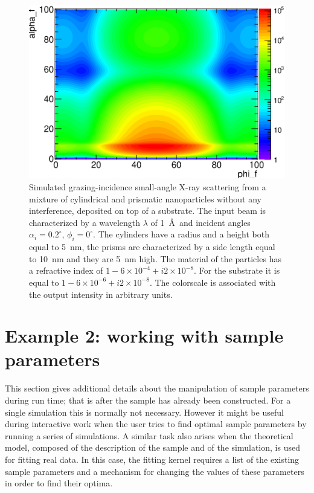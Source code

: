 \begin{figure}[htbp]
  \begin{center}
   \includegraphics[clip=true, width=120mm]{Figures/gisasmap/Manual_ex1.eps}
  \end{center}
  \caption[Example 1: Simulated grazing-incidence small-angle X-ray scattering from a mixture of
cylindrical and prismatic nanoparticles without any interference, deposited on top
of a substrate]{Simulated grazing-incidence small-angle X-ray scattering from a mixture of
cylindrical and prismatic nanoparticles without any interference, deposited on top
of a substrate. The input beam is characterized by a wavelength
$\lambda$ of 1~\AA\ and incident angles $\alpha_i=0.2^{\circ}$, $\phi_i=0^{\circ}$. The
cylinders have a radius and a height both equal to 5~nm, the prisms
are characterized by a side length equal to 10~nm and they are 5~nm high. The
material of the particles has a refractive index of $1-6\times 10^{-4}+i2\times 10^{-8}$. For the substrate
it is equal to $1-6\times 10^{-6} +i2\times 10^{-8} $. The colorscale
is associated with the output intensity in arbitrary units. }
\label{fig:output_ex1}
\end{figure}



%
\section{Example 2: working with sample parameters} 

This section gives additional details about the manipulation of sample parameters
during run time; that is after the sample has already been constructed. 
For a single simulation this is normally not necessary. However it might be useful
during interactive work when the user tries to find optimal sample parameters by
running a series of simulations.
A similar task also arises when the theoretical model, composed of the
description of the sample and of the simulation, is used for fitting real data.
In this case, the fitting kernel requires a list of the existing sample parameters
and a mechanism for changing the values of these parameters in order to find 
their optima.

